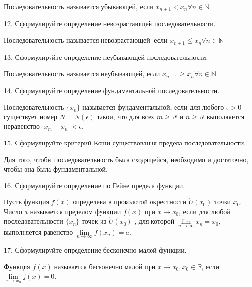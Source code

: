 \documentclass[a4paper, 10pt]{article}
\begin{document}
    Последовательность называется убывающей, если $x_{n+1} < x_n \forall n \in \mathbb{N}$
        
    \begin{bf}12. Сформулируйте определение невозрастающей последовательности.\end{bf}
    
    Последовательность называется невозрастающей, если $x_{n+1} \leqslant x_n \forall n \in \mathbb{N}$
        
    \begin{bf}13. Сформулируйте определение неубывающей последовательности.\end{bf}
    
    Последовательность называется неубывающей, если $x_{n+1} \geqslant x_n \forall n \in \mathbb{N}$
    
    \begin{bf}14. Сформулируйте определение фундаментальной последовательности.\end{bf}
    
    Последовательность $\{x_n\}$ называется фундаментальной, если для любого $\epsilon > 0$ 
    существует номер $N = N(\epsilon)$ такой, что для всех $m  \geqslant  N$ и $n  \geqslant  N$ выполняется 
    неравенство $| x_m - x_n | < \epsilon$.

    \begin{bf}15. Сформулируйте критерий Коши существования предела последовательности.\end{bf}

    Для того, чтобы последовательность была сходящейся, необходимо и достаточно, чтобы она была фундаментальной.

    \begin{bf}16. Сформулируйте определение по Гейне предела функции.\end{bf}

    Пусть функция $f(x)$ определена в проколотой окрестности $\mathring U(x_0)$ точки $x_0$. 
    Число $a$ называется пределом функции $f(x)$ при $x \to x_0$, если для любой последовательности 
    $\{x_n\}$ точек из $\mathring U(x_0)$ , для которой $\lim\limits_{n \to \infty} x_n = x_0$,
    выполняется равенство $\lim\limits_{n \to \infty} f(x_n) = a$.

    \begin{bf}17. Сформулируйте определение бесконечно малой функции.\end{bf}

    Функция $f(x)$ называется бесконечно малой при $x \to x_0, x_0 \in \mathbb{R}$, если 
    $\lim\limits_{x \to x_0} f(x) = 0$.
\end{document}
